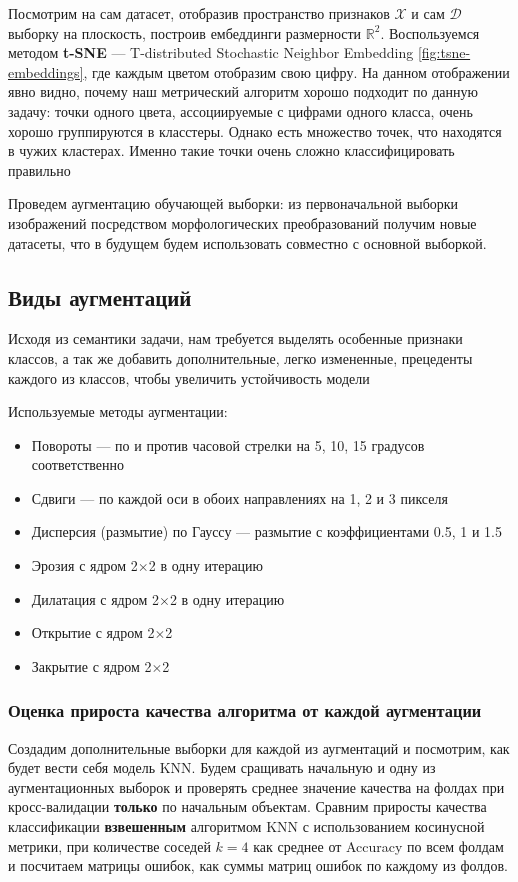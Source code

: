 \documentclass{article}
\begin{document}
    Посмотрим на сам датасет, отобразив пространство признаков $\mathcal{X}$ и сам $\mathcal{D}$ выборку на плоскость, построив ембеддинги размерности $\mathds{R}^2$. Воспользуемся методом \textbf{t-SNE} — T-distributed Stochastic Neighbor Embedding \ref{fig:tsne-embeddings}, где каждым цветом отобразим свою цифру. На данном отображении явно видно, почему наш метрический алгоритм хорошо подходит по данную задачу: точки одного цвета, ассоциируемые с цифрами одного класса, очень хорошо группируются в класстеры. Однако есть множество точек, что находятся в чужих кластерах. Именно такие точки очень сложно классифицировать правильно

    Проведем аугментацию обучающей выборки: из первоначальной выборки изображений посредством морфологических преобразований получим новые датасеты, что в будущем будем использовать совместно с основной выборкой.

    \subsection{Виды аугментаций}
        Исходя из семантики задачи, нам требуется выделять особенные признаки классов, а так же добавить дополнительные, легко измененные, прецеденты каждого из классов, чтобы увеличить устойчивость модели

        Используемые методы аугментации:
        \begin{itemize}
            \item Повороты — по и против часовой стрелки на 5, 10, 15 градусов соответственно
            \item Сдвиги — по каждой оси в обоих направлениях на 1, 2 и 3 пикселя
            \item Дисперсия (размытие) по Гауссу — размытие с коэффициентами 0.5, 1 и 1.5
            \item Эрозия с ядром 2$\times$2 в одну итерацию
            \item Дилатация с ядром 2$\times$2 в одну итерацию
            \item Открытие с ядром 2$\times$2 
            \item Закрытие с ядром 2$\times$2
        \end{itemize}

        \subsubsection{Оценка прироста качества алгоритма от каждой аугментации}
            Создадим дополнительные выборки для каждой из аугментаций и посмотрим, как будет вести себя модель KNN. Будем сращивать начальную и одну из аугментационных выборок и проверять среднее значение качества на фолдах при кросс-валидации \textbf{только} по начальным объектам. Сравним приросты качества классификации \textbf{взвешенным} алгоритмом KNN с использованием косинусной метрики, при количестве соседей $k=4$ как среднее от Accuracy по всем фолдам и посчитаем матрицы ошибок, как суммы матриц ошибок по каждому из фолдов.
\end{document}
